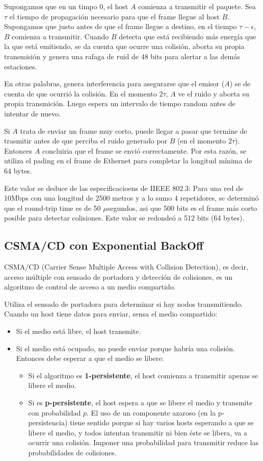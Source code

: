 Supongamos que en un timpo 0, el host \(A\) comienza a transmitir el paquete. Sea   \(\tau\) el tiempo de propagación necesario para que el frame llegue al host \(B\). Supongamos que justo antes de que el frame llegue a destino, en el tiempo \(\tau-\epsilon\), \(B\) comienza a transmitir. Cuando \(B\) detecta que está recibiendo más energía que la que está emitiendo, se da cuenta que ocurre una colisión, aborta su propia transmisión y genera una rafaga de ruid de 48 bits para alertar a las demás estaciones. 

En otras palabras, genera interferencia para asegurarse que el emisor (\(A\)) se de cuenta de que ocurrió la colisión. En el momento \(2\tau\), \(A\) ve el ruido y aborta su propia transmición. Luego espera un intervalo de tiempo random antes de intentar de nuevo.

Si \(A\) trata de enviar un frame muy corto, puede llegar a pasar que termine de trasmitir antes de que  perciba el ruido generado por \(B\) (en el momento \(2\tau\)). Entonces \(A\) concluiria que el frame se envió correctamente. Por esta razón, se utiliza el pading en el frame de Ethernet para completar la longitud mínima de 64 bytes.

Este valor se deduce de las especificacioens de IIEEE 802.3: Para una red de 10Mbps con una longitud de 2500 metros y a lo sumo 4 repetidores, se determinó que el round-trip time es de 50 \(\mu\)segundos, asi que 500 bits es el frame más corto posible para detectar colisiones. Este valor se redondeó a 512 bits (64 bytes).

\subsection{CSMA/CD con Exponential BackOff}\label{section::csma}
CSMA/CD (Carrier Sense Multiple Access with Collision Detection), es decir, acceso múltiple con sensado de portadora y detección de colisiones, es un algoritmo de control de acceso a un medio compartido.

Utiliza el sensado de portadora para determinar si hay nodos transmitiendo. Cuando un host tiene datos para enviar, sensa el medio compartido:
\begin{itemize}
  \item Si el medio está libre, el host transmite.
  \item Si el medio está ocupado, no puede enviar porque habría una colisión. Entonces debe esperar a que el medio se libere:
  \begin{itemize}
    \item Si el algoritmo es \textbf{1-persistente}, el host comienza a transmitir apenas se libere el medio.
    \item Si es \textbf{p-persistente}, el host espera a que se libere el medio y transmite con probabilidad \(p\). El uso de un componente azaroso (en la p-persistencia) tiene sentido porque si hay varios
    hosts esperando a que se libere el medio, y todos intentan transmitir ni bien éste se libera, va
    a ocurrir una colisión. Imponer una probabilidad para transmitir reduce las probabilidades de
    colisiones.
  \end{itemize}
\end{itemize}

